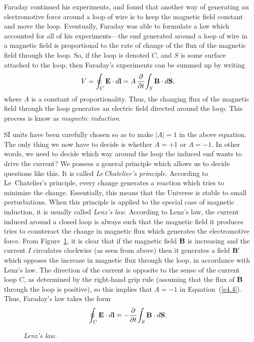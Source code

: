 Faraday continued his experiments, and found that 
another way of generating an electromotive force around a loop of wire
is to keep the  magnetic field  constant
and move the loop. Eventually,  Faraday was able to
formulate a law which accounted for all of his experiments---the emf
generated around a loop of wire in a magnetic field is proportional to
the rate of change of the flux of the magnetic field through the loop. So,
if the loop is denoted $C$, and $S$ is some surface attached to the loop, then Faraday's
experiments can be summed up by writing
\begin{equation}\label{e4.4}
V = \oint_C{\bf E} \cdot d{\bf l} = A \,\frac{\partial }{\partial t}\!
\int_S {\bf B} \cdot d{\bf S},
\end{equation}
where $A$ is a constant of proportionality. 
Thus,  the changing flux of the magnetic field
through the loop 
generates  an electric field directed around the loop. This process is know as
{\em magnetic induction}.

 SI units have been carefully chosen so as to make $|A| = 1$ in
the above equation. The only thing we now have to decide is whether
$A=+1$ or $A=-1$. In other words, we need to decide which way around the loop  the induced emf
wants to drive the current? We possess a general principle which allows us to
decide  questions like this. It is called
{\em Le\,Chatelier's principle}. According to Le~Chatelier's principle, every change
generates a reaction which tries to minimize the change. Essentially, this means
that the Universe is stable to small perturbations. When this principle
is applied to the special case of
magnetic induction, it is usually called {\em Lenz's law}. According to Lenz's
law,  the current induced around a closed loop 
is always such that the magnetic field it produces tries  to counteract the
change in magnetic flux which generates the electromotive force. 
From  Figure~\ref{f33}, it is clear that if the magnetic field ${\bf B}$ is
increasing and  the current $I$ circulates clockwise (as seen from above) then
it generates a field ${\bf B}'$ which opposes the increase in magnetic flux
through the loop, in
accordance with Lenz's law. The direction of the current is opposite to the
sense of the current loop $C$, as determined by the right-hand grip rule (assuming that the flux of ${\bf B}$ through the
loop is positive), so this implies that $A=-1$ in Equation~(\ref{e4.4}). Thus, Faraday's
law takes the form
\begin{equation}\label{e4.5}
\oint_C {\bf E} \cdot d{\bf l} = - \frac{\partial}{\partial t}\! \int_S 
{\bf B} \cdot d{\bf S}.
\end{equation}
\begin{figure}
\centerline{}
\caption{\em Lenz's law.}\label{f33}
\end{figure}

